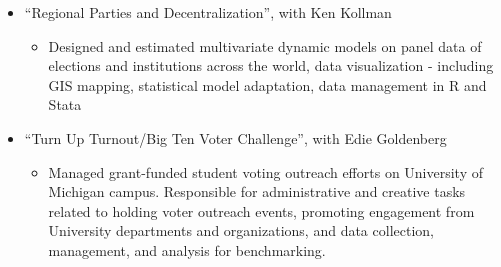 \documentclass[10pt,letterpaper,unicode]{moderncv}        %
\begin{document}
{\begin{itemize}
\begin{itemize}
	\end{itemize}
	\item ``Regional Parties and Decentralization'', with Ken Kollman
	\begin{itemize}
		\item Designed and estimated multivariate dynamic models on panel data of elections and institutions across the world, data visualization - including GIS mapping, statistical model adaptation, data management in R and Stata
	\end{itemize}
	\item ``Turn Up Turnout/Big Ten Voter Challenge'', with Edie Goldenberg
	\begin{itemize}
		\item Managed grant-funded student voting outreach efforts on University of Michigan campus. Responsible for administrative and creative tasks related to holding voter outreach events, promoting engagement from University departments and organizations, and data collection, management, and analysis for benchmarking.
	\end{itemize}
\end{itemize}}

\newpage %
\end{document}

